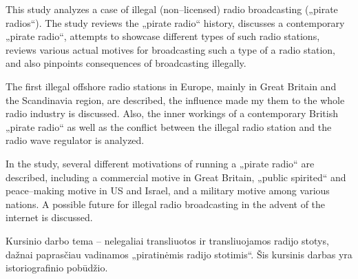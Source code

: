 \documentclass[kursinis-darbas]{vukf}
\begin{document}
\begin{vukfAbstractEn}

This study analyzes a case of illegal (non--licensed) radio broadcasting („pirate radios“). The study reviews the „pirate radio“ history, discusses a contemporary „pirate radio“, attempts to showcase different types of such radio stations, reviews various actual motives for broadcasting such a type of a radio station, and also pinpoints consequences of broadcasting illegally.

The first illegal offshore radio stations in Europe, mainly in Great Britain and the Scandinavia region, are described, the influence made my them to the whole radio industry is discussed. Also, the inner workings of a contemporary British „pirate radio“ as well as the conflict between the illegal radio station and the radio wave regulator is analyzed.

In the study, several different motivations of running a „pirate radio“ are described, including a commercial motive in Great Britain, „public spirited“ and peace--making motive in US and Israel, and a military motive among various nations. A possible future for illegal radio broadcasting in the advent of the internet is discussed.

\end{vukfAbstractEn}


%
%





%
%

\vukfIntroduction


Kursinio darbo tema – nelegaliai transliuotos ir transliuojamos radijo stotys, dažnai paprasčiau vadinamos „piratinėmis radijo stotimis“. Šis kursinis darbas yra istoriografinio pobūdžio.
\end{document}
